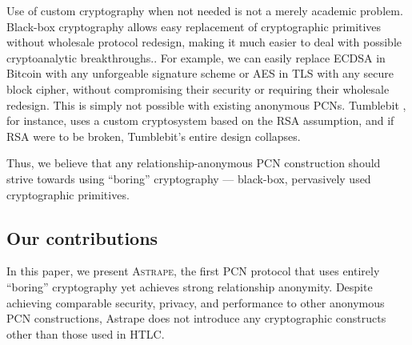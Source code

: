 \documentclass[USenglish,oneside,twocolumn]{article}
\newcommand{\Astrape}[0]{\textsc{Astrape}}
\begin{document}
Use of custom cryptography when not needed is not a merely academic problem. Black-box cryptography allows easy replacement of cryptographic primitives without wholesale protocol redesign, making it much easier to deal with possible cryptoanalytic breakthroughs.. For example, we can easily replace ECDSA in Bitcoin with any unforgeable signature scheme or AES in TLS with any secure block cipher, without compromising their security or requiring their wholesale redesign. This is simply not possible with existing anonymous PCNs. Tumblebit \cite{heilman2017tumblebit}, for instance, uses a custom cryptosystem based on the RSA assumption, and if RSA were to be broken, Tumblebit's entire design collapses.

Thus, we believe that any relationship-anonymous PCN construction should strive towards using ``boring'' cryptography --- black-box, pervasively used cryptographic primitives.

\subsection{Our contributions}

In this paper, we present \Astrape, the first PCN protocol that uses entirely ``boring'' cryptography yet achieves strong relationship anonymity. Despite achieving comparable security, privacy, and performance to other anonymous PCN constructions, Astrape does not introduce any cryptographic constructs other than those used in HTLC.
\end{document}
